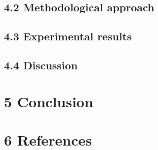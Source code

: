 \documentclass[authoryear,review,3p]{elsarticle}
\begin{document}
\subsection*{4.2 Methodological approach}
\subsection*{4.3 Experimental results}
\subsection*{4.4 Discussion}


\bigskip
\section*{5 Conclusion}



\bigskip
\section*{6 References}



\end{document}
